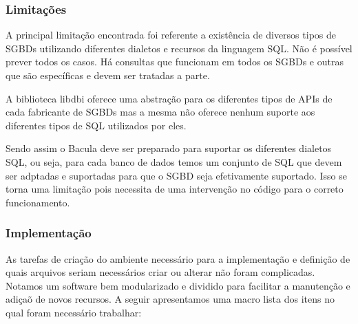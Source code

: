 \subsubsection{Limitações}

A principal limitação encontrada foi referente a existência de diversos tipos de SGBDs utilizando diferentes dialetos e recursos da linguagem SQL. Não é possível prever todos os casos. Há consultas que funcionam em todos os SGBDs e outras que são específicas e devem ser tratadas a parte. 

A biblioteca libdbi oferece uma abstração para os diferentes tipos de APIs de cada fabricante de SGBDs mas a mesma não oferece nenhum suporte aos diferentes tipos de SQL utilizados por eles.

Sendo assim o Bacula deve ser preparado para suportar os diferentes dialetos SQL, ou seja, para cada banco de dados temos um conjunto de SQL que devem ser adptadas e suportadas para que o SGBD seja efetivamente suportado. Isso se torna uma limitação pois necessita de uma intervenção no código para o correto funcionamento.

\subsubsection{Implementação}

As tarefas de criação do ambiente necessário para a implementação e definição de quais arquivos seriam necessários criar ou alterar não foram complicadas. Notamos um software bem modularizado e dividido para facilitar a manutenção e adiçaõ de novos recursos. A seguir apresentamos uma macro lista dos itens no qual foram necessário trabalhar:

